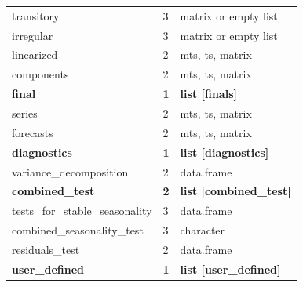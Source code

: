 \documentclass[article]{jss}
\begin{document}
\begin{longtable}{lll}
\addlinespace
\hspace{3em}transitory & 3 & matrix or empty list\\
\hspace{3em}irregular & 3 & matrix or empty list\\
\hspace{2em}linearized & 2 & mts, ts, matrix\\
\hspace{2em}components & 2 & mts, ts, matrix\\
\textbf{\hspace{1em}final} & \textbf{1} & \textbf{list [finals]}\\
\addlinespace
\hspace{2em}series & 2 & mts, ts, matrix\\
\hspace{2em}forecasts & 2 & mts, ts, matrix\\
\textbf{\hspace{1em}diagnostics} & \textbf{1} & \textbf{list [diagnostics]}\\
\hspace{2em}variance\_decomposition & 2 & data.frame\\
\textbf{\hspace{2em}combined\_test} & \textbf{2} & \textbf{list [combined\_test]}\\
\addlinespace
\hspace{3em}tests\_for\_stable\_seasonality & 3 & data.frame\\
\hspace{3em}combined\_seasonality\_test & 3 & character\\
\hspace{2em}residuals\_test & 2 & data.frame\\
\textbf{\hspace{1em}user\_defined} & \textbf{1} & \textbf{list [user\_defined]}\\
\bottomrule
\end{longtable}
\end{document}
